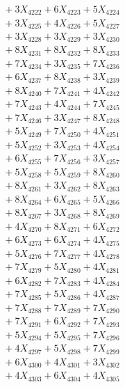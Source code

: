 \documentclass[a4paper,10pt]{article}
\begin{document}
{\begin{align}
&\;  + 3 X_{4222} + 6 X_{4223} + 5 X_{4224} \\[0.3ex]
&\;  + 3 X_{4225} + 4 X_{4226} + 5 X_{4227} \\[0.3ex]
&\;  + 3 X_{4228} + 3 X_{4229} + 3 X_{4230} \\[0.3ex]
&\;  + 8 X_{4231} + 8 X_{4232} + 8 X_{4233} \\[0.3ex]
&\;  + 7 X_{4234} + 3 X_{4235} + 7 X_{4236} \\[0.3ex]
&\;  + 6 X_{4237} + 8 X_{4238} + 3 X_{4239} \\[0.5ex]\allowbreak
&\;  + 8 X_{4240} + 7 X_{4241} + 4 X_{4242} \\[0.3ex]
&\;  + 7 X_{4243} + 4 X_{4244} + 7 X_{4245} \\[0.3ex]
&\;  + 7 X_{4246} + 3 X_{4247} + 8 X_{4248} \\[0.3ex]
&\;  + 5 X_{4249} + 7 X_{4250} + 4 X_{4251} \\[0.3ex]
&\;  + 5 X_{4252} + 3 X_{4253} + 4 X_{4254} \\[0.3ex]
&\;  + 6 X_{4255} + 7 X_{4256} + 3 X_{4257} \\[0.3ex]
&\;  + 5 X_{4258} + 5 X_{4259} + 8 X_{4260} \\[0.3ex]
&\;  + 8 X_{4261} + 3 X_{4262} + 8 X_{4263} \\[0.3ex]
&\;  + 8 X_{4264} + 6 X_{4265} + 5 X_{4266} \\[0.3ex]
&\;  + 8 X_{4267} + 3 X_{4268} + 8 X_{4269} \\[0.5ex]\allowbreak
&\;  + 4 X_{4270} + 8 X_{4271} + 6 X_{4272} \\[0.3ex]
&\;  + 6 X_{4273} + 6 X_{4274} + 4 X_{4275} \\[0.3ex]
&\;  + 5 X_{4276} + 7 X_{4277} + 4 X_{4278} \\[0.3ex]
&\;  + 7 X_{4279} + 5 X_{4280} + 4 X_{4281} \\[0.3ex]
&\;  + 6 X_{4282} + 7 X_{4283} + 4 X_{4284} \\[0.3ex]
&\;  + 7 X_{4285} + 5 X_{4286} + 4 X_{4287} \\[0.3ex]
&\;  + 7 X_{4288} + 7 X_{4289} + 7 X_{4290} \\[0.3ex]
&\;  + 7 X_{4291} + 6 X_{4292} + 7 X_{4293} \\[0.3ex]
&\;  + 5 X_{4294} + 5 X_{4295} + 7 X_{4296} \\[0.3ex]
&\;  + 4 X_{4297} + 5 X_{4298} + 7 X_{4299} \\[0.5ex]\allowbreak
&\;  + 6 X_{4300} + 4 X_{4301} + 3 X_{4302} \\[0.3ex]
&\;  + 4 X_{4303} + 6 X_{4304} + 4 X_{4305} \\[0.3ex]

\end{align}}
\end{document}
